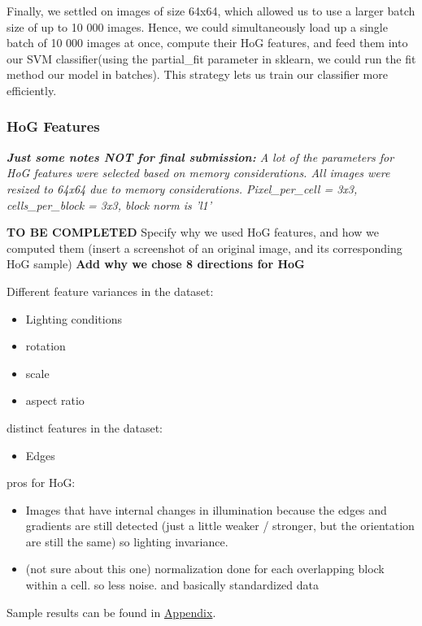 \documentclass[12pt]{article}
\begin{document}
 Finally, we settled on images of size 64x64, which allowed us to use a larger batch size of up to 10 000 images. Hence, we could simultaneously load up a single batch of 10 000 images at once, compute their HoG features, and feed them into our SVM classifier(using the partial\_fit parameter in sklearn, we could run the fit method our model in batches). This strategy lets us train our classifier more efficiently.

\subsubsection{HoG Features}


\textit{\textbf{Just some notes NOT for final submission: } A lot of the parameters for HoG features were selected based on memory considerations. All images were resized to 64x64 due to memory considerations. Pixel\_per\_cell = 3x3, cells\_per\_block = 3x3, block norm is 'l1'}


\textbf{TO BE COMPLETED} Specify why we used HoG features, and how we computed them (insert a screenshot of an original image, and its corresponding HoG sample) 
\textbf{Add why we chose 8 directions for HoG}

Different feature variances in the dataset: 
\begin{itemize}
    \item Lighting conditions 
    \item rotation 
    \item scale 
    \item aspect ratio 
\end{itemize}

distinct features in the dataset: 
\begin{itemize}
    \item Edges
    
\end{itemize}

pros for HoG: 
\begin{itemize}
    \item Images that have internal changes in illumination because the edges and gradients are still detected (just a little weaker / stronger, but the orientation are still the same) so lighting invariance. 
    \item (not sure about this one) normalization done for each overlapping block within a cell. so less noise. and basically standardized data
\end{itemize}

Sample results can be found in \hyperref[appendix:HoG]{Appendix}.
\end{document}
